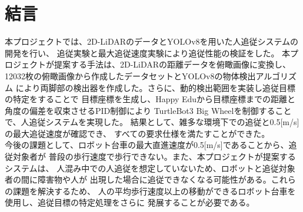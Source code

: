 \section{結言}

本プロジェクトでは、2D-LiDARのデータとYOLOv8を用いた人追従システムの開発を行い、
追従実験と最大追従速度実験により追従性能の検証をした。
本プロジェクトが提案する手法は、2D-LiDARの距離データを俯瞰画像に変換し、
12032枚の俯瞰画像から作成したデータセットとYOLOv8の物体検出アルゴリズム
により両脚部の検出器を作成した。さらに、動的検出範囲を実装し追従目標の特定をすることで
目標座標を生成し、Happy Eduから目標座標までの距離と角度の偏差を収束させるPID制御により
TurtleBot3 Big Wheelを制御することで、人追従システムを実現した。
結果として、雑多な環境下での追従と0.5[m/s]の最大追従速度が確認でき、
すべての要求仕様を満たすことができた。\\ \indent
今後の課題として、ロボット台車の最大直進速度が0.5[m/s]であることから、追従対象者が
普段の歩行速度で歩行できない。また、本プロジェクトが提案するシステムは、
人混み中での人追従を想定していないため、ロボットと追従対象者の間に障害物や人が
出現した場合に追従できなくなる可能性がある。これらの課題を解決するため、
人の平均歩行速度以上の移動ができるロボット台車を使用し、追従目標の特定処理をさらに
発展することが必要である。